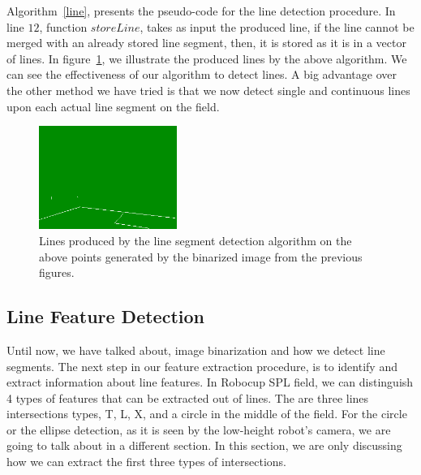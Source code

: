 \documentclass[	DIV=calc,%
							paper=a4,%
							fontsize=9pt,%
							twocolumn]{scrartcl}	 					%
\begin{document}
Algorithm~\ref{line}, presents the pseudo-code for the line detection procedure. In line $12$, function $storeLine$, takes as input the produced line, if the line cannot be merged with an already stored line segment, then, it is stored as it is in a vector of lines. In figure~\ref{lines}, we illustrate the produced lines by the above algorithm. We can see the effectiveness of our algorithm to detect lines. A big advantage over the other method we have tried is that we now detect single and continuous lines upon each actual line segment on the field.

\begin{figure}[t!]
\caption{Lines produced by the line segment detection algorithm on the above points generated by the binarized image from the previous figures.}
\label{lines}
\centering    
\includegraphics[width=0.4\textwidth]{figures/lines.png}
\end{figure}

\subsection{Line Feature Detection}
Until now, we have talked about, image binarization and how we detect line segments. The next step in our feature extraction procedure, is to identify and extract information about line features. In Robocup SPL field, we can distinguish 4 types of features that can be extracted out of lines. The are three lines intersections types, T, L, X, and a circle in the middle of the field. For the circle or the ellipse detection, as it is seen by the low-height robot's camera, we are going to talk about in a different section. In this section, we are only discussing how we can extract the first three types of intersections.
\end{document}
